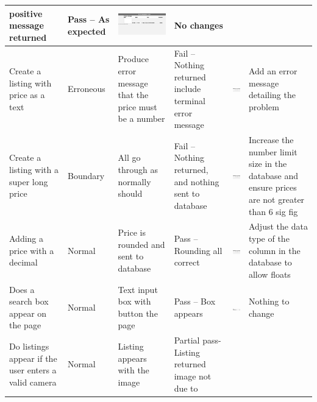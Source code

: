 \begin{center}
\begin{longtable}{|P{17mm}|P{17mm}|P{16mm}|P{17mm}|P{40mm}|P{21.5mm}|}
positive message returned & Pass -- As expected &
\includegraphics[width=38mm]{ch3_developing/proto1/media/image7.png}
& No changes \\ \hline
Create a listing with price as a text & Erroneous & Produce error
message that the price must be a number & Fail -- Nothing returned
include terminal error message &
\includegraphics[width=38mm]{ch3_developing/proto1/media/image8.png}
& Add an error message detailing the problem \\ \hline
Create a listing with a super long price & Boundary & All go through as
normally should & Fail -- Nothing returned, and nothing sent to database
&
\includegraphics[width=38mm]{ch3_developing/proto1/media/image7.png}
& Increase the number limit size in the database and ensure prices are
not greater than 6 sig fig \\ \hline
Adding a price with a decimal & Normal & Price is rounded and sent to
database & Pass -- Rounding all correct &
\includegraphics[width=38mm]{ch3_developing/proto1/media/image7.png}
& Adjust the data type of the column in the database to allow floats \\ \hline
Does a search box appear on the page & Normal & Text input box with
button the page & Pass -- Box appears &
\includegraphics[width=38mm]{ch3_developing/proto1/media/image10.png}
& Nothing to change \\ \hline
Do listings appear if the user enters a valid camera & Normal & Listing
appears with the image & Partial pass- Listing returned image not due to

\end{longtable}
\end{center}
